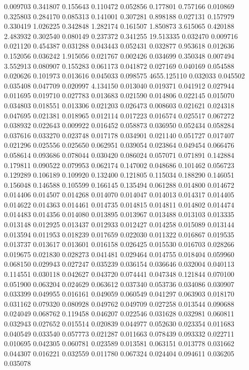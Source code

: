 0.009703
0.341807
0.155643
0.110472
0.052856
0.177801
0.757166
0.010869
0.325803
0.284170
0.085313
0.141001
0.307281
0.898188
0.027131
0.157979
0.330419
1.026225
0.342848
1.282174
0.161507
1.850873
3.615065
0.420188
2.483932
0.302540
0.080149
0.237372
0.341255
19.513335
0.032470
0.009716
0.021120
0.454387
0.031288
0.043443
0.052431
0.032877
0.953618
0.012636
0.152056
0.036242
1.915056
0.021767
0.002426
0.034699
0.350348
0.007494
3.552913
0.080907
0.155283
0.061173
0.041872
0.027169
0.040169
0.054588
0.020626
0.101973
0.013616
0.045033
0.098575
4655.125110
0.032033
0.045502
0.035408
0.047709
0.020997
4.134150
0.013040
0.019371
0.041912
0.027944
0.011695
0.019710
0.027783
0.013683
0.021590
0.014806
0.022145
0.015070
0.034803
0.018551
0.013306
0.021203
0.026473
0.008603
0.021621
0.024318
0.047695
0.021381
0.018965
0.012114
0.017223
0.016574
0.025517
0.067272
0.038932
0.022643
0.009922
0.016452
0.058873
0.036950
0.052434
0.058284
0.037616
0.033270
0.023748
0.017178
0.034901
0.021140
0.051727
0.017407
0.021296
0.025556
0.025650
0.062951
0.039054
0.023864
0.049454
0.066476
0.058614
0.093686
0.078044
0.030420
0.086024
0.057071
0.071891
0.142884
0.179811
0.090522
0.079953
0.062174
0.147002
0.048686
0.101462
0.056723
0.129289
0.106189
0.109920
0.132400
0.121805
0.115034
0.188290
0.146051
0.156048
0.146588
0.105599
0.166145
0.135494
0.061288
0.014800
0.014672
0.014406
0.014507
0.014268
0.014070
0.014047
0.014013
0.014317
0.014405
0.014622
0.014363
0.014461
0.014735
0.014815
0.014811
0.014802
0.014474
0.014483
0.014356
0.014080
0.013895
0.013967
0.013488
0.013103
0.013335
0.013148
0.012925
0.013437
0.012933
0.012427
0.014258
0.015089
0.013144
0.013594
0.011953
0.018239
0.017659
0.022030
0.011322
0.016867
0.019535
0.013737
0.013617
0.013601
0.016158
0.026425
0.015530
0.016703
0.028266
0.019675
0.021830
0.028273
0.041481
0.029464
0.014755
0.018404
0.059960
0.068150
0.029943
0.027247
0.035239
0.036154
0.036646
0.032004
0.040113
0.114551
0.030118
0.042627
0.043720
0.074441
0.047348
0.121844
0.070100
0.051900
0.063204
0.024629
0.063612
0.037340
0.053736
0.034086
0.030907
0.033399
0.049955
0.016161
0.049059
0.060549
0.041297
0.063903
0.018170
0.031162
0.079320
0.080928
0.049762
0.049709
0.027258
0.013544
0.090688
0.024049
0.068762
0.119458
0.046207
0.022546
0.031628
0.032981
0.060811
0.032943
0.027652
0.015514
0.020839
0.044977
0.052630
0.023354
0.011683
0.040549
0.033540
0.057773
0.021287
0.011663
0.078439
0.093332
0.022711
0.010695
0.042305
0.060781
0.023589
0.013581
0.063151
0.013778
0.031662
0.044307
0.016221
0.032559
0.011780
0.067324
0.024404
0.094611
0.036205
0.035078
